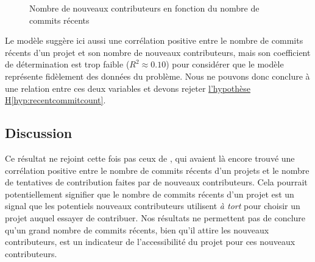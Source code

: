 \begin{figure}[ht]
    

    

    \caption{Nombre de nouveaux contributeurs en fonction du nombre de \glspl{commit} récents}
    \label{fig:commitCount}
\end{figure}

Le modèle suggère ici aussi une corrélation positive entre le nombre de \glspl{commit} récents d'un projet et
son nombre de nouveaux contributeurs, mais son coefficient de détermination est trop faible ($R^2 \approx
0.10$) pour considérer que le modèle représente fidèlement des données du problème. Nous ne pouvons donc
conclure à une relation entre ces deux variables et devons rejeter
\hyperref[hyp:recentcommitcount]{l'hypothèse H\ref*{hyp:recentcommitcount}}.

\subsection{Discussion}

Ce résultat ne rejoint cette fois pas ceux de \textcite[p.~13,16]{signals-2019}, qui avaient là encore trouvé
une corrélation positive entre le nombre de \glspl{commit} récents d'un projets et le nombre de tentatives de
contribution faites par de nouveaux contributeurs. Cela pourrait potentiellement signifier que le nombre de
\glspl{commit} récents d'un projet est un signal que les potentiels nouveaux contributeurs utilisent \emph{à
tort} pour choisir un projet auquel essayer de contribuer. Nos résultats ne permettent pas de conclure qu'un
grand nombre de \glspl{commit} récents, bien qu'il attire les nouveaux contributeurs, est un indicateur de
l'accessibilité du projet pour ces nouveaux contributeurs.
